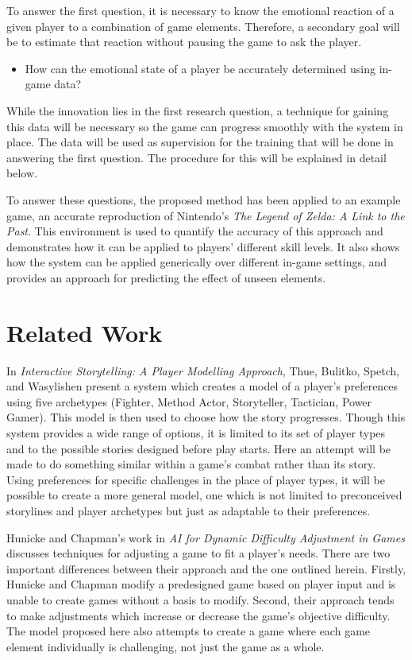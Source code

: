 \documentclass[a4paper]{article}
\begin{document}
\begin{multicols*}{2}
To answer the first question, it is necessary to know the emotional reaction of a given player to a combination of game elements. Therefore, a secondary goal will be to estimate that reaction without pausing the game to ask the player.
\begin{itemize} \item[\textbf{2.}] How can the emotional state of a player be accurately determined using in-game data? \end{itemize}
While the innovation lies in the first research question, a technique for gaining this data will be necessary so the game can progress smoothly with the system in place. The data will be used as supervision for the training that will be done in answering the first question. The procedure for this will be explained in detail below.

To answer these questions, the proposed method has been applied to an example game, an accurate reproduction of Nintendo's \emph{The Legend of Zelda: A Link to the Past}. This environment is used to quantify the accuracy of this approach and demonstrates how it can be applied to players' different skill levels. It also shows how the system can be applied generically over different in-game settings, and provides an approach for predicting the effect of unseen elements.

\section{Related Work}
In \cite{PlayerModeling} \emph{Interactive Storytelling: A Player Modelling Approach}, Thue, Bulitko, Spetch, and Wasylishen present a system which creates a model of a player's preferences using five archetypes (Fighter, Method Actor, Storyteller, Tactician, Power Gamer). This model is then used to choose how the story progresses. Though this system provides a wide range of options, it is limited to its set of player types and to the possible stories designed before play starts.
Here an attempt will be made to do something similar within a game's combat rather than its story. Using preferences for specific challenges in the place of player types, it will be possible to create a more general model, one which is not limited to preconceived storylines and player archetypes but just as adaptable to their preferences.

Hunicke and Chapman's work in \emph{AI for Dynamic Difficulty Adjustment in Games} \cite{DDAinGames} discusses techniques for adjusting a game to fit a player's needs. There are two important differences between their approach and the one outlined herein. Firstly, Hunicke and Chapman modify a predesigned game based on player input and is unable to create games without a basis to modify. Second, their approach tends to make adjustments which increase or decrease the game's objective difficulty. The model proposed here also attempts to create a game where each game element individually is challenging, not just the game as a whole.


\end{multicols*}
\end{document}
